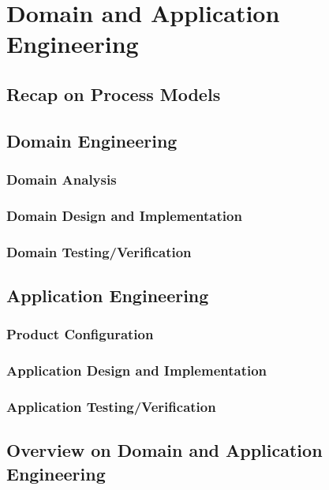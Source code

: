 \documentclass[
	aspectratio=169, %
	8pt, %
	handout, %
]{beamer}
\subtitle{8. Development Process}
\author{Thomas Thüm}
\begin{document}


\section{Domain and Application Engineering}

\subsection{Recap on Process Models}
\subsection{Domain Engineering}
\subsubsection{Domain Analysis}
\subsubsection{Domain Design and Implementation}
\subsubsection{Domain Testing/Verification}
\subsection{Application Engineering}
\subsubsection{Product Configuration}
\subsubsection{Application Design and Implementation}
\subsubsection{Application Testing/Verification}
\subsection{Overview on Domain and Application Engineering}
\end{document}

